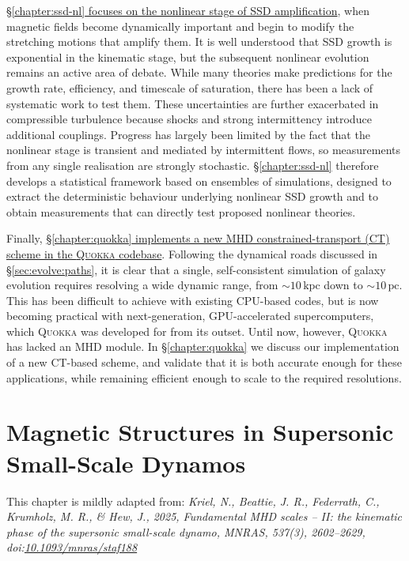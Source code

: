 \documentclass[12pt,twoside]{extreport}
\providecommand{\DIFaddbegin}{} %
\providecommand{\DIFaddend}{} %
\providecommand{\DIFdelbegin}{} %
\providecommand{\DIFdelend}{} %
\providecommand{\DIFscaledelfig}{0.5}
\newlength{\DIFdelgraphicswidth} %
\newlength{\DIFdelgraphicsheight} %
\providecommand{\DIFaddincludegraphics}[2][]{{\color{DIFgreen}\fbox{\DIFOincludegraphics[#1]{#2}}}} %
\providecommand{\DIFdelincludegraphics}[2][]{%
\sbox{\DIFdelgraphicsbox}{\DIFOincludegraphics[#1]{#2}}%
\settoboxwidth{\DIFdelgraphicswidth}{\DIFdelgraphicsbox} %
\settoboxtotalheight{\DIFdelgraphicsheight}{\DIFdelgraphicsbox} %
\scalebox{\DIFscaledelfig}{%
\parbox[b]{\DIFdelgraphicswidth}{\usebox{\DIFdelgraphicsbox}\\[-\baselineskip] \rule{\DIFdelgraphicswidth}{0em}}\llap{\resizebox{\DIFdelgraphicswidth}{\DIFdelgraphicsheight}{%
\setlength{\unitlength}{\DIFdelgraphicswidth}%
\begin{picture}(1,1)%
\thicklines\linethickness{2pt} %
{\color{DIFpurple}\put(0,0){\framebox(1,1){}}}%
{\color{DIFpurple}\put(0,0){\line( 1,1){1}}}%
{\color{DIFpurple}\put(0,1){\line(1,-1){1}}}%
\end{picture}%
}\hspace*{3pt}}} %
} %
\DeclareRobustCommand{\DIFaddbegin}{\DIFOaddbegin \let\includegraphics\DIFaddincludegraphics} %
\DeclareRobustCommand{\DIFaddend}{\DIFOaddend \let\includegraphics\DIFOincludegraphics} %
\DeclareRobustCommand{\DIFdelbegin}{\DIFOdelbegin \let\includegraphics\DIFdelincludegraphics} %
\DeclareRobustCommand{\DIFdelend}{\DIFOaddend \let\includegraphics\DIFOincludegraphics} %
\begin{document}
\uline{\S\ref{chapter:ssd-nl} focuses on the nonlinear stage of SSD amplification}, when magnetic fields become dynamically important and begin to modify the stretching motions that amplify them. It is well understood that SSD growth is exponential in the kinematic stage, but the subsequent nonlinear evolution remains an active area of debate. While many theories make predictions for the growth rate, efficiency, and timescale of saturation, there has been a lack of systematic work to test them. These uncertainties are further exacerbated in compressible turbulence because shocks and strong intermittency introduce additional couplings. Progress has largely been limited by the fact that the nonlinear stage is transient and mediated by intermittent flows, so measurements from any single realisation are strongly stochastic. \S\ref{chapter:ssd-nl} therefore develops a statistical framework based on ensembles of simulations, designed to extract the deterministic behaviour underlying nonlinear SSD growth and to obtain measurements that can directly test proposed nonlinear theories.

Finally, \DIFdelbegin %
\DIFdelend \DIFaddbegin \uline{\S\ref{chapter:quokka} implements a new MHD constrained-transport (CT) scheme in the \textsc{Quokka} codebase}\DIFaddend . Following the dynamical roads discussed in \S\ref{sec:evolve:paths}, it is clear that a single, self-consistent simulation of galaxy evolution requires resolving a wide dynamic range, from $\sim 10 \,\mathrm{kpc}$ down to $\sim 10 \,\mathrm{pc}$. This has been difficult to achieve with existing CPU-based codes, but is now becoming practical with next-generation, GPU-accelerated supercomputers, which \textsc{Quokka} was developed for from its outset. Until now, however, \textsc{Quokka} has lacked an MHD module. In \S\ref{chapter:quokka} we discuss our implementation of a new CT-based scheme, and validate that it  is both accurate enough for these applications, while remaining efficient enough to scale to the required resolutions.

    \chapter{Magnetic Structures in Supersonic Small-Scale Dynamos}
\label{chapter:ssd-exp}

\noindent\hfill\parbox{0.865\textwidth}{\raggedleft
This chapter is mildly adapted from:
\textit{Kriel, N., Beattie, J. R., Federrath, C., Krumholz, M. R., \& Hew, J., 2025, Fundamental MHD scales -- II: the kinematic phase of the supersonic small-scale dynamo, MNRAS, 537(3), 2602–2629, doi:\href{https://doi.org/10.1093/mnras/staf188}{10.1093/mnras/staf188}}
}\par
\end{document}
